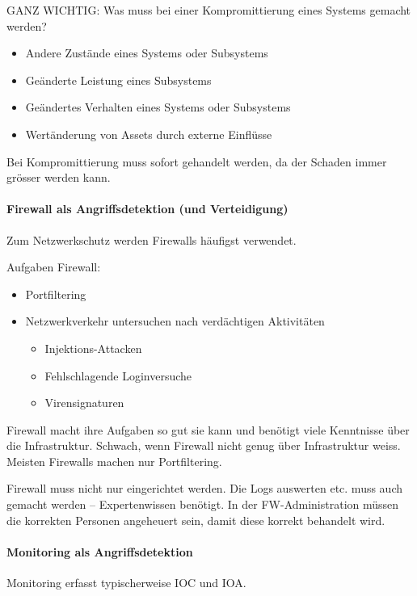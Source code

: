 \documentclass[a4paper,12pt]{article}
\begin{document}
GANZ WICHTIG: Was muss bei einer Kompromittierung eines Systems gemacht werden?

\begin{itemize}
\item Andere Zustände eines Systems oder Subsystems
\item Geänderte Leistung eines Subsystems
\item Geändertes Verhalten eines Systems oder Subsystems
\item Wertänderung von Assets durch externe Einflüsse
\end{itemize}

Bei Kompromittierung muss sofort gehandelt werden, da der Schaden immer grösser werden kann.

\paragraph{Firewall als Angriffsdetektion (und Verteidigung)}
Zum Netzwerkschutz werden Firewalls häufigst verwendet.

Aufgaben Firewall:
\begin{itemize}
\item Portfiltering
\item Netzwerkverkehr untersuchen nach verdächtigen Aktivitäten
    \begin{itemize}
    \item Injektions-Attacken
    \item Fehlschlagende Loginversuche
    \item Virensignaturen
    \end{itemize}
\end{itemize}

Firewall macht ihre Aufgaben so gut sie kann und benötigt viele Kenntnisse über die Infrastruktur. Schwach, wenn Firewall nicht genug über Infrastruktur weiss. Meisten Firewalls machen nur Portfiltering.

Firewall muss nicht nur eingerichtet werden. Die Logs auswerten etc. muss auch gemacht werden -- Expertenwissen benötigt. In der FW-Administration müssen die korrekten Personen angeheuert sein, damit diese korrekt behandelt wird.

\paragraph{Monitoring als Angriffsdetektion}
Monitoring erfasst typischerweise IOC und IOA.
\end{document}

